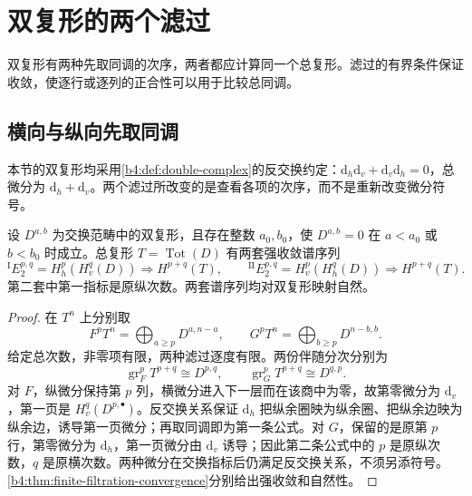 
\section{双复形的两个滤过}
\label{b4:sec:1501}

双复形有两种先取同调的次序，两者都应计算同一个总复形。滤过的有界条件保证收敛，使逐行或逐列的正合性可以用于比较总同调。

%
%

\subsection{横向与纵向先取同调}
\label{b4:subsec:1501:01}

本节的双复形均采用\cref{b4:def:double-complex}的反交换约定：\(\mathrm{d}_h\mathrm{d}_v+\mathrm{d}_v\mathrm{d}_h=0\)，总微分为 \(\mathrm{d}_h+\mathrm{d}_v\)。两个滤过所改变的是查看各项的次序，而不是重新改变微分符号。

\begin{theorem}\label{b4:thm:double-complex-spectral-sequences}
	设 \(D^{a,b}\) 为交换范畴中的双复形，且存在整数 \(a_0,b_0\)，使 \(D^{a,b}=0\) 在 \(a<a_0\) 或 \(b<b_0\) 时成立。总复形 \(T=\operatorname{Tot}(D)\) 有两套强收敛谱序列
	\[
		{}^{\mathrm I}E_2^{p,q}=H_h^p(H_v^q(D))\Longrightarrow H^{p+q}(T), \qquad {}^{\mathrm {II}}E_2^{p,q}=H_v^p(H_h^q(D))\Longrightarrow H^{p+q}(T).
	\]
	第二套中第一指标是原纵次数。两套谱序列均对双复形映射自然。
\end{theorem}
\begin{proof}
	在 \(T^n\) 上分别取
	\[
		F^pT^n=\bigoplus_{a\ge p}D^{a,n-a},\qquad G^pT^n=\bigoplus_{b\ge p}D^{n-b,b}.
	\]
	给定总次数，非零项有限，两种滤过逐度有限。两份伴随分次分别为
	\[
		\operatorname{gr}_F^pT^{p+q}\cong D^{p,q},\qquad \operatorname{gr}_G^pT^{p+q}\cong D^{q,p}.
	\]
	对 \(F\)，纵微分保持第 \(p\) 列，横微分进入下一层而在该商中为零，故第零微分为 \(\mathrm{d}_v\)，第一页是 \(H_v^q(D^{p,\bullet})\)。反交换关系保证 \(\mathrm{d}_h\) 把纵余圈映为纵余圈、把纵余边映为纵余边，诱导第一页微分；再取同调即为第一条公式。对 \(G\)，保留的是原第 \(p\) 行，第零微分为 \(\mathrm{d}_h\)，第一页微分由 \(\mathrm{d}_v\) 诱导；因此第二条公式中的 \(p\) 是原纵次数，\(q\) 是原横次数。两种微分在交换指标后仍满足反交换关系，不须另添符号。\cref{b4:thm:finite-filtration-convergence}分别给出强收敛和自然性。
\end{proof}

